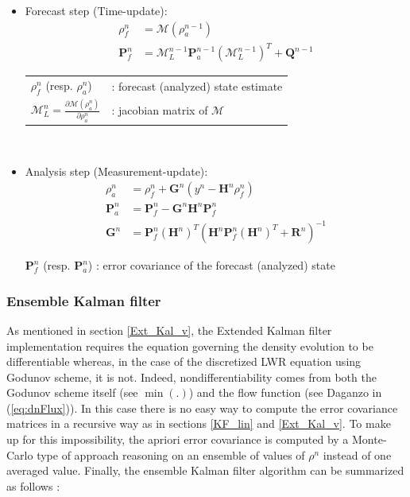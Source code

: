 \documentclass[letterpaper,10pt]{article}
\begin{document}
\begin{itemize}
\item Forecast step (Time-update): \begin{align}
\rho_{f}^{n} & =\mathcal{M}(\rho_{a}^{n-1})\label{eq:ekf1}\\
\mathbf{P}_{f}^{n} &
=\mathcal{M}_{L}^{n-1}\mathbf{P}_{a}^{n-1}\left(\mathcal{M}_{L}^{n-1}\right)^{T}
+\mathbf{Q}^{n-1}\label{eq:ekf2}\end{align}
\hspace{10 mm}
\begin{tabular}{ll}
${\rho}_{f}^{n}$ (resp. ${\rho}_{a}^{n}$) &: forecast (analyzed) state estimate\\
$\mathcal{M}_{L}^{n}=\frac{\partial\mathcal{M}(\rho_{a}^{n})}{\partial \rho_{a}^{n}}$& : jacobian matrix of $\mathcal{M}$\\
\end{tabular}\\


\item Analysis step (Measurement-update): \begin{align}
\rho_{a}^{n} &
=\rho_{f}^{n}+\mathbf{G}^{n}\left(y^{n}-\mathbf{H}^{n}\rho_{f}^{n}\right)\\
\mathbf{P}_{a}^{n} &
=\mathbf{P}_{f}^{n}-\mathbf{G}^{n}\mathbf{H}^{n}\mathbf{P}_{f}^{n}\\
\mathbf{G}^{n} &
=\mathbf{P}_{f}^{n}\left(\mathbf{H}^{n}\right)^{T}\left(\mathbf{H}^{n}\mathbf{P}
_{f}^{n}\left(\mathbf{H}^{n}\right)^{T}+\mathbf{R}^{n}\right)^{-1}\label{
eq:kalmangain}\end{align}

$\mathbf{P}_{f}^{n}$ (resp. $\mathbf{P}_{a}^{n}$) : error covariance of the forecast (analyzed) state

\end{itemize} 


\subsubsection{Ensemble Kalman filter}
As mentioned in section \ref{Ext_Kal_v}, the Extended Kalman filter implementation requires the equation governing the density evolution to be differentiable whereas, in the case of the discretized LWR equation using Godunov scheme, it is not. Indeed, nondifferentiability comes from both the Godunov scheme itself (see $\min (.)$) and the flow function (see Daganzo in (\ref{eq:dnFlux})). In this case there is no easy way to compute the error covariance matrices in a recursive way as in sections \ref{KF_lin} and \ref{Ext_Kal_v}. To make up for this impossibility, the apriori error covariance is computed by a Monte-Carlo type of approach reasoning on an ensemble of values of $\rho^n$ instead of one averaged value.  
Finally, the ensemble Kalman filter algorithm can be summarized as follows \cite{Evensen2007}:
\end{document}
